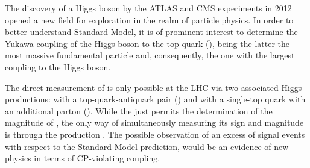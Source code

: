 \begin{comment}
\paragraph{Measurement of the top-quark polarisation}\mbox{}\\
The top quark is the heaviest elementary particle discovered so far, with a mass of cd
$\mtop = 172.76 \pm 0.30 \,$GeV \cite{pdgTop}. Due to its large mass, it presents some unique features. 
Being one of the most relevant the fact that it is the only quark that decays before hadronising. This allows to 
measure its properties through its decay products. At LHC the top quark can be produced either via the strong
interaction, resulting in quark-antiquark pairs (\ttbar), or by the electroweak interaction, which produces them singly. 
In the second scenario, the single-top quarks are created with their spin aligned in a particular direction.
My contribution to the measurement of the polarisation observables is presented in Chapter \ref{chap:Polarisation}.
The result of this work is presented in reference \cite{ATLAS:2021vhx}.




\paragraph{Search for associated production of a Higgs boson and a single top quark}\mbox{}\\
\end{comment}

The discovery of a Higgs boson by the ATLAS \cite{20121_ATLAS_HiggsDiscovery} and CMS \cite{201230_CMS_HiggsDiscovery} experiments in 2012 opened 
a new field for exploration in the realm of particle physics. In order to better understand 
Standard Model, it is of prominent interest to determine the Yukawa coupling of 
the Higgs boson to the top quark (\yt), being the latter the most massive fundamental particle 
and, consequently, the one with the largest coupling to the Higgs boson.


The direct measurement of \yt is only possible at the LHC via two associated
Higgs productions: with a top-quark-antiquark pair (\ttH) and with a single-top quark with an additional parton (\tHq).
While the \ttH just permits the determination of the magnitude of \yt, the only way of simultaneously 
measuring its sign and magnitude is through the \tH production \cite{Demartin:2015uha}. The possible observation of an excess 
of signal events with respect to the Standard Model prediction, would be an 
evidence of new physics in terms of CP-violating \yt coupling.

